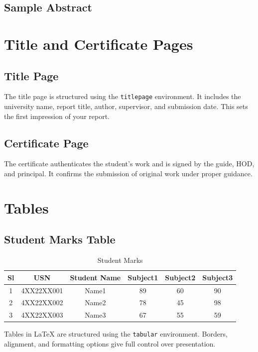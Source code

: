 \documentclass[12pt,a4paper]{report}
\begin{document}
\section{Sample Abstract}
\justify
\lipsum[5-6]

\chapter{Title and Certificate Pages}
\section{Title Page}
\justify
The title page is structured using the \texttt{titlepage} environment. It includes the university name, report title, author, supervisor, and submission date. This sets the first impression of your report.

\section{Certificate Page}
\justify
The certificate authenticates the student’s work and is signed by the guide, HOD, and principal. It confirms the submission of original work under proper guidance.

\lipsum[7]

\chapter{Tables}
\section{Student Marks Table}
\begin{table}[H]
\centering
\begin{tabular}{|c|c|c|c|c|c|}
\hline
Sl & USN & Student Name & Subject1 & Subject2 & Subject3 \\
\hline
1 & 4XX22XX001 & Name1 & 89 & 60 & 90 \\
2 & 4XX22XX002 & Name2 & 78 & 45 & 98 \\
3 & 4XX22XX003 & Name3 & 67 & 55 & 59 \\
\hline
\end{tabular}
\caption{Student Marks}
\end{table}

\justify
Tables in LaTeX are structured using the \texttt{tabular} environment. Borders, alignment, and formatting options give full control over presentation.
\end{document}
